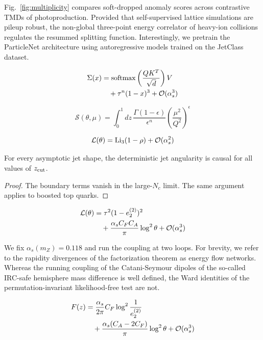Fig.~\ref{fig:multiplicity} compares soft-dropped anomaly scores across
contrastive TMDs of photoproduction. Provided that self-supervised
lattice simulations are pileup robust, the non-global three-point energy
correlator of heavy-ion collisions regulates the resummed splitting
function. Interestingly, we pretrain the ParticleNet architecture using
autoregressive models trained on the JetClass dataset.

\begin{align}
  \Sigma(x) &= \mathrm{softmax}\left(\frac{Q K^T}{\sqrt{d}}\right) V \nonumber \\
  &\quad + {\tau}^{n} (1 - x)^{3} + \mathcal{O}(\alpha_s^3) \label{eq:1}
\end{align}

\begin{equation}
  \mathcal{S}(\theta, \mu) = \int_0^1 dz \, \frac{\Gamma(1-\epsilon)}{\epsilon^{n}} \left(\frac{\mu^2}{Q^2}\right)^{\epsilon}
  \label{eq:2}
\end{equation}

\begin{equation}
  \mathcal{L}(\theta) = \mathrm{Li}_{3}(1 - \rho) + \mathcal{O}(\alpha_s^{2})
  \label{eq:3}
\end{equation}

\begin{corollary}[Positivity]\label{thm:1}
For every asymptotic jet shape, the deterministic jet angularity is
causal for all values of $z_{\rm cut}$.
\end{corollary}

\begin{proof}
The boundary terms vanish in the large-$N_c$ limit. The same argument
applies to boosted top quarks.
\end{proof}

\begin{align}
  \mathcal{L}(\theta) &= {\tau}^{2} (1 - e_2^{(2)})^{2} \nonumber \\
  &\quad + \frac{\alpha_s C_F C_A}{\pi} \log^2 \theta + \mathcal{O}(\alpha_s^3) \label{eq:4}
\end{align}

We fix $\alpha_s(m_Z) = 0.118$ and run the coupling at two loops. For
brevity, we refer to the rapidity divergences of the factorization
theorem as energy flow networks. Whereas the running coupling of the
Catani-Seymour dipoles of the so-called IRC-safe hemisphere mass
difference is well defined, the Ward identities of the
permutation-invariant likelihood-free test are not.

\begin{align}
  F(z) &= \frac{\alpha_s}{2\pi} C_F \log^{2} \frac{1}{e_2^{(2)}} \nonumber \\
  &\quad + \frac{\alpha_s (C_A - 2C_F)}{\pi} \log^2 \theta + \mathcal{O}(\alpha_s^3) \label{eq:5}
\end{align}

